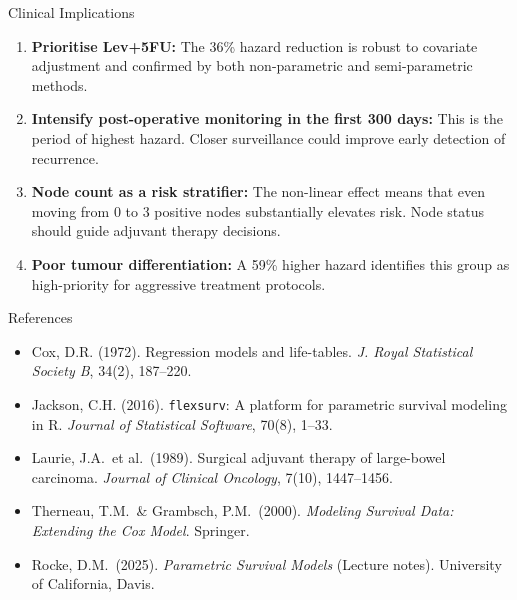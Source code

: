 \documentclass[aspectratio=169, 10pt]{beamer}
\begin{document}
\begin{frame}{Clinical Implications}
\large
\begin{enumerate}\setlength\itemsep{8pt}

  \item \textbf{Prioritise Lev+5FU:} The 36\% hazard
        reduction is robust to covariate adjustment and
        confirmed by both non-parametric and
        semi-parametric methods.

  \item \textbf{Intensify post-operative monitoring in
        the first 300 days:} This is the period of
        highest hazard. Closer surveillance could improve
        early detection of recurrence.

  \item \textbf{Node count as a risk stratifier:}
        The non-linear effect means that even moving from
        0 to 3 positive nodes substantially elevates risk.
        Node status should guide adjuvant therapy decisions.

  \item \textbf{Poor tumour differentiation:}
        A 59\% higher hazard identifies this group as
        high-priority for aggressive treatment protocols.

\end{enumerate}

\end{frame}

\begin{frame}{References}

\small
\begin{itemize}\setlength\itemsep{5pt}
  \item Cox, D.R. (1972).
        Regression models and life-tables.
        \textit{J. Royal Statistical Society B}, 34(2), 187--220.

  \item Jackson, C.H. (2016).
        \texttt{flexsurv}: A platform for parametric survival
        modeling in R.
        \textit{Journal of Statistical Software}, 70(8), 1--33.

  \item Laurie, J.A.\ et al.\ (1989).
        Surgical adjuvant therapy of large-bowel carcinoma.
        \textit{Journal of Clinical Oncology}, 7(10), 1447--1456.

  \item Therneau, T.M.\ \& Grambsch, P.M.\ (2000).
        \textit{Modeling Survival Data: Extending the Cox Model}.
        Springer.

  \item Rocke, D.M.\ (2025).
        \textit{Parametric Survival Models} (Lecture notes).
        University of California, Davis.
\end{itemize}

\end{frame}
\end{document}
